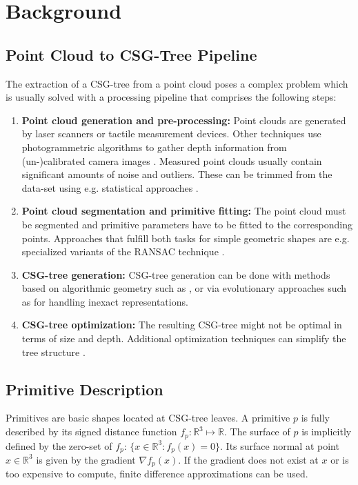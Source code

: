 \section{Background}
\label{sec:back}
\subsection{Point Cloud to \ac{CSG}-Tree Pipeline} 
\label{sec:pipeline}
The extraction of a \ac{CSG}-tree from a point cloud poses a complex problem which is usually solved with a processing pipeline that comprises the following steps:  
\begin{enumerate}
\item \textbf{Point cloud generation and pre-processing:} Point clouds are generated by laser scanners or tactile measurement devices. 
Other techniques use photogrammetric algorithms to gather depth information from (un-)calibrated camera images \cite{hartley2003multiple}.
Measured point clouds usually contain significant amounts of noise and outliers. 
These can be trimmed from the data-set using e.g. statistical approaches  \cite{rusu20113d}.
\item \textbf{Point cloud segmentation and primitive fitting:} The point cloud must be segmented and primitive parameters have to be fitted to the corresponding points. Approaches that fulfill both tasks for simple geometric shapes are e.g. specialized variants of the \ac{RANSAC} technique \cite{schnabel2007efficient}.
\item \textbf{\ac{CSG}-tree generation:} \ac{CSG}-tree generation can be done with methods based on algorithmic geometry such as \cite{shapiro1993separation, buchele2004three}, 
or via evolutionary approaches such as \cite{fayolle2016evolutionary} for handling inexact representations.
\item \textbf {\ac{CSG}-tree optimization:} The resulting \ac{CSG}-tree might not be optimal in terms of size and depth.
Additional optimization techniques can simplify the tree structure \cite{shapiro1991construction}. 
\end{enumerate}
\subsection{Primitive Description}
Primitives are basic shapes located at \ac{CSG}-tree leaves. 
A primitive $p$ is fully described by its signed distance function $f_p: \mathbb{R}^3 \mapsto \mathbb{R}$.
The surface of $p$ is implicitly defined by the zero-set of $f_p$: $\{x \in \mathbb{R}^3 : f_p(x)=0\}$.
Its surface normal at point $x \in \mathbb{R}^3$ is given by the gradient $\nabla f_p(x)$.
If the gradient does not exist at $x$ or is too expensive to compute, 
finite difference approximations can be used.
